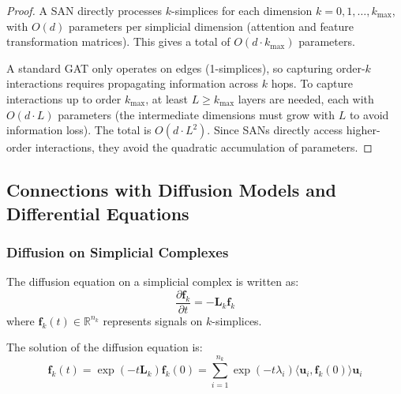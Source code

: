 \begin{proof}
A SAN directly processes $k$-simplices for each dimension $k = 0, 1, \ldots, k_{\max}$, with $O(d)$ parameters per simplicial dimension (attention and feature transformation matrices). This gives a total of $O(d \cdot k_{\max})$ parameters.

A standard \gls{GAT} only operates on edges (1-simplices), so capturing order-$k$ interactions requires propagating information across $k$ hops. To capture interactions up to order $k_{\max}$, at least $L \geq k_{\max}$ layers are needed, each with $O(d \cdot L)$ parameters (the intermediate dimensions must grow with $L$ to avoid information loss). The total is $O(d \cdot L^2)$. Since SANs directly access higher-order interactions, they avoid the quadratic accumulation of parameters.
\end{proof}

\subsection{Connections with Diffusion Models and Differential Equations}

\subsubsection{Diffusion on Simplicial Complexes}

\begin{definition}\label{def:ecuacion_difusion_simplicial}
The diffusion equation on a simplicial complex is written as:
\begin{equation}
    \frac{\partial \mathbf{f}_k}{\partial t} = -\mathbf{L}_k \mathbf{f}_k
\end{equation}
where $\mathbf{f}_k(t) \in \mathbb{R}^{n_k}$ represents signals on $k$-simplices.
\end{definition}

\begin{theorem}\label{thm:solucion_difusion_simplicial}
The solution of the diffusion equation is:
\begin{equation}
    \mathbf{f}_k(t) = \exp(-t\mathbf{L}_k) \mathbf{f}_k(0) = \sum_{i=1}^{n_k} \exp(-t\lambda_i) \langle \mathbf{u}_i, \mathbf{f}_k(0) \rangle \mathbf{u}_i
\end{equation}
\end{theorem}

